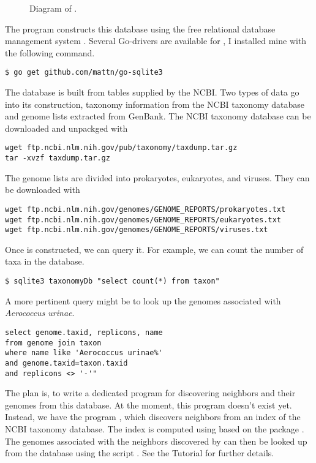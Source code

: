 \begin{figure}
  \begin{center}
    
  \end{center}
  \caption{Diagram of .}\label{fig:db}
\end{figure}

The program  constructs this database using the free
relational database management system . Several Go-drivers
are available for , I installed mine with the following
command.
\begin{verbatim}
$ go get github.com/mattn/go-sqlite3
\end{verbatim}

The database is built from tables supplied by the NCBI. Two types of
data go into its construction, taxonomy information from the NCBI
taxonomy database and genome lists extracted from GenBank. The NCBI
taxonomy database can be downloaded and unpackged with
\begin{verbatim}
wget ftp.ncbi.nlm.nih.gov/pub/taxonomy/taxdump.tar.gz
tar -xvzf taxdump.tar.gz
\end{verbatim}
The genome lists are divided into prokaryotes, eukaryotes, and
viruses. They can be downloaded with
\begin{verbatim}
wget ftp.ncbi.nlm.nih.gov/genomes/GENOME_REPORTS/prokaryotes.txt
wget ftp.ncbi.nlm.nih.gov/genomes/GENOME_REPORTS/eukaryotes.txt
wget ftp.ncbi.nlm.nih.gov/genomes/GENOME_REPORTS/viruses.txt
\end{verbatim}

Once  is constructed, we can query it. For example, we
can count the number of taxa in the database.
\begin{verbatim}
$ sqlite3 taxonomyDb "select count(*) from taxon"
\end{verbatim}

A more pertinent query might be to look up the genomes associated
with \emph{Aerococcus urinae}.
\begin{verbatim}
select genome.taxid, replicons, name 
from genome join taxon 
where name like 'Aerococcus urinae%' 
and genome.taxid=taxon.taxid 
and replicons <> '-'"
\end{verbatim}

The plan is, to write a dedicated program for discovering neighbors
and their genomes from this database. At the moment, this program
doesn't exist yet. Instead, we have the program , which
discovers neighbors from an index of the NCBI taxonomy database. The
index is computed using  based on the package . The
genomes associated with the neighbors discovered by  can then
be looked up from the database using the script . See
the Tutorial for further details.

